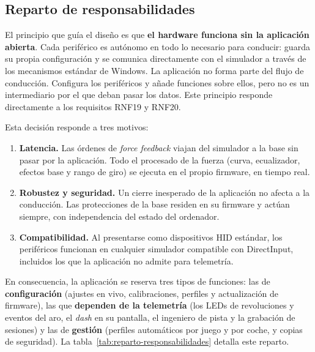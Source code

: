 \subsection{Reparto de responsabilidades}
\label{subsec:reparto-responsabilidades}
El principio que guía el diseño es que \textbf{el hardware funciona sin la aplicación abierta}. Cada periférico es autónomo en todo lo necesario para conducir: guarda su propia configuración y se comunica directamente con el simulador a través de los mecanismos estándar de Windows. La aplicación no forma parte del flujo de conducción. Configura los periféricos y añade funciones sobre ellos, pero no es un intermediario por el que deban pasar los datos. Este principio responde directamente a los requisitos RNF19 y RNF20.

Esta decisión responde a tres motivos:

\begin{enumerate}
	\item \textbf{Latencia.} Las órdenes de \textit{force feedback} viajan del simulador a la base sin pasar por la aplicación. Todo el procesado de la fuerza (curva, ecualizador, efectos base y rango de giro) se ejecuta en el propio firmware, en tiempo real.
	\item \textbf{Robustez y seguridad.} Un cierre inesperado de la aplicación no afecta a la conducción. Las protecciones de la base residen en su firmware y actúan siempre, con independencia del estado del ordenador.
	\item \textbf{Compatibilidad.} Al presentarse como dispositivos HID estándar, los periféricos funcionan en cualquier simulador compatible con DirectInput, incluidos los que la aplicación no admite para telemetría.
\end{enumerate}

En consecuencia, la aplicación se reserva tres tipos de funciones: las de \textbf{configuración} (ajustes en vivo, calibraciones, perfiles y actualización de firmware), las que \textbf{dependen de la telemetría} (los LEDs de revoluciones y eventos del aro, el \textit{dash} en su pantalla, el ingeniero de pista y la grabación de sesiones) y las de \textbf{gestión} (perfiles automáticos por juego y por coche, y copias de seguridad). La tabla~\ref{tab:reparto-responsabilidades} detalla este reparto.

